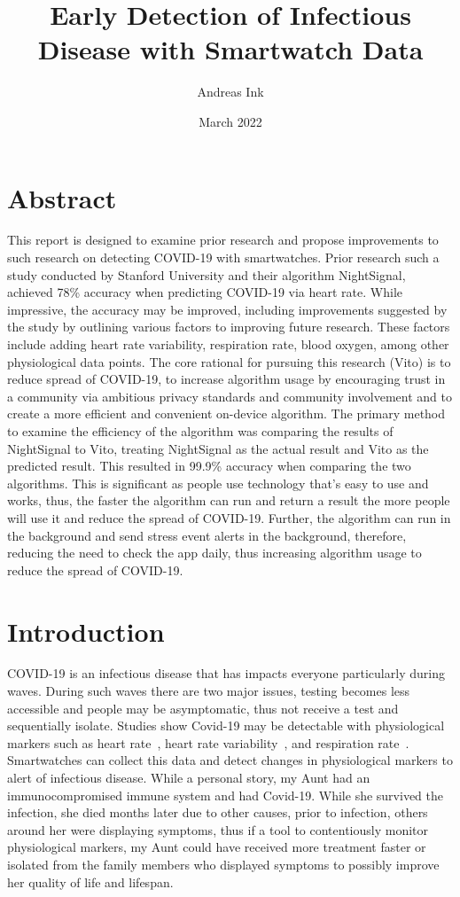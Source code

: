 \documentclass{article}
\title{Early Detection of Infectious Disease with Smartwatch Data}
\author{Andreas Ink}
\date{March 2022}
\begin{document}
\maketitle
\section{Abstract}


This report is designed to examine prior research and propose improvements to such research on detecting COVID-19 with smartwatches.  Prior research such a study conducted by Stanford University and their algorithm NightSignal, achieved 78\% accuracy when predicting COVID-19 via heart rate.  While impressive, the accuracy may be improved, including improvements suggested by the study by outlining various factors to improving future research.  These factors include adding heart rate variability, respiration rate, blood oxygen, among other physiological data points.  The core rational for pursuing this research (Vito) is to reduce spread of COVID-19, to increase algorithm usage by encouraging trust in a community via ambitious privacy standards and community involvement and to create a more efficient and convenient on-device algorithm.  The primary method to examine the efficiency of the algorithm was comparing the results of NightSignal to Vito, treating NightSignal as the actual result and Vito as the predicted result.  This resulted in 99.9\% accuracy when comparing the two algorithms. This is significant as people use technology that's easy to use and works, thus, the faster the algorithm can run and return a result the more people will use it and reduce the spread of COVID-19.  Further, the algorithm can run in the background and send stress event alerts in the background, therefore, reducing the need to check the app daily, thus increasing algorithm usage to reduce the spread of COVID-19.

\section{Introduction}

COVID-19 is an infectious disease that has impacts everyone particularly during waves.  During such waves there are two major issues, testing becomes less accessible and people may be asymptomatic, thus not receive a test and sequentially isolate.  Studies show Covid-19 may be detectable with physiological markers such as heart rate~\cite{NightSignal}, heart rate variability~\cite{hrv}, and respiration rate~\cite{vital}. Smartwatches can collect this data and detect changes in physiological markers to alert of infectious disease.  While a personal story, my Aunt had an immunocompromised immune system and had Covid-19.  While she survived the infection, she died months later due to other causes, prior to infection, others around her were displaying symptoms, thus if a tool to contentiously monitor physiological markers, my Aunt could have received more treatment faster or isolated from the family members who displayed symptoms to possibly improve her quality of life and lifespan.  
\end{document}
